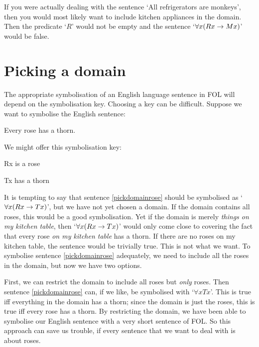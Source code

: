 If you were actually dealing with the sentence `All refrigerators are monkeys', then you would most likely want to include kitchen appliances in the domain. Then the predicate `$R$' would not be empty and the sentence `$\forall x(Rx \rightarrow Mx)$' would be false.


\section{Picking a domain}
The appropriate symbolisation of an English language sentence in FOL will depend on the symbolisation key. Choosing a key can be difficult. Suppose we want to symbolise the English sentence:
	\begin{earg}
		\item[\ex{pickdomainrose}] Every rose has a thorn.
	\end{earg}
We might offer this symbolisation key:
	\begin{ekey}
		\item[Rx]  is a rose
		\item[Tx]  has a thorn
	\end{ekey}
It is tempting to say that sentence \ref{pickdomainrose} should be symbolised as `$\forall x(Rx \rightarrow Tx)$', but we have not yet chosen a domain. If the domain contains all roses, this would be a good symbolisation. Yet if the domain is merely \emph{things on my kitchen table}, then `$\forall x(Rx \rightarrow Tx)$' would only come close to covering the fact that every rose \emph{on my kitchen table} has a thorn. If there are no roses on my kitchen table, the sentence would be trivially true. This is not what we want. To symbolise sentence \ref{pickdomainrose} adequately, we need to include all the roses in the domain, but now we have two options. 

First, we can restrict the domain to include all roses but \emph{only} roses. Then sentence \ref{pickdomainrose} can, if we like, be symbolised with `$\forall x Tx$'. This is true iff everything in the domain has a thorn; since the domain is just the roses, this is true iff every rose has a thorn. By restricting the domain, we have been able to symbolise our English sentence with a very short sentence of FOL. So this approach can save us trouble, if every sentence that we want to deal with is about roses.

